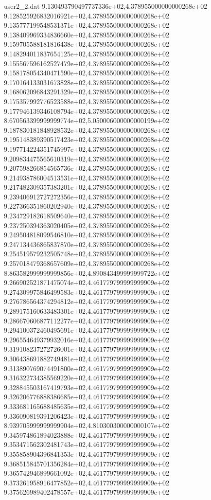 \begin{filecontents}{user2_2.dat}
9.130493790497737336e+02,4.378955000000000268e+02
9.128525926832016921e+02,4.378955000000000268e+02
9.135777199548531371e+02,4.378955000000000268e+02
9.138409969334836660e+02,4.378955000000000268e+02
9.159705588181816438e+02,4.378955000000000268e+02
9.148294011837654125e+02,4.378955000000000268e+02
9.155567596162527479e+02,4.378955000000000268e+02
9.158178054340471590e+02,4.378955000000000268e+02
9.170164133031673828e+02,4.378955000000000268e+02
9.168062096843291329e+02,4.378955000000000268e+02
9.175357992776523588e+02,4.378955000000000268e+02
9.177946139346108794e+02,4.378955000000000268e+02
8.670563399999999774e+02,5.050006000000000199e+02
9.187830181848928532e+02,4.378955000000000268e+02
9.195148389390517423e+02,4.378955000000000268e+02
9.197714224351745997e+02,4.378955000000000268e+02
9.209834475565610319e+02,4.378955000000000268e+02
9.207598266854565736e+02,4.378955000000000268e+02
9.214938786004513531e+02,4.378955000000000268e+02
9.217482309357383201e+02,4.378955000000000268e+02
9.239406912727272356e+02,4.378955000000000268e+02
9.227366351860202940e+02,4.378955000000000268e+02
9.234729182618509640e+02,4.378955000000000268e+02
9.237250394363020405e+02,4.378955000000000268e+02
9.249504818099546810e+02,4.378955000000000268e+02
9.247134436865837870e+02,4.378955000000000268e+02
9.254519579232505748e+02,4.378955000000000268e+02
9.257018479368657609e+02,4.378955000000000268e+02
8.863582999999999856e+02,4.890843499999999722e+02
9.266902521871475074e+02,4.461779799999999909e+02
9.274309975846499583e+02,4.461779799999999909e+02
9.276786564374294812e+02,4.461779799999999909e+02
9.289175160633483301e+02,4.461779799999999909e+02
9.286670606877112277e+02,4.461779799999999909e+02
9.294100372460495691e+02,4.461779799999999909e+02
9.296554649379932016e+02,4.461779799999999909e+02
9.319108237272726001e+02,4.461779799999999909e+02
9.306438691882749481e+02,4.461779799999999909e+02
9.313890769074491800e+02,4.461779799999999909e+02
9.316322734385569220e+02,4.461779799999999909e+02
9.328845503167419793e+02,4.461779799999999909e+02
9.326206776888386685e+02,4.461779799999999909e+02
9.333681165688485635e+02,4.461779799999999909e+02
9.336090819391206423e+02,4.461779799999999909e+02
8.939705999999999904e+02,4.810300300000000107e+02
9.345974861894023888e+02,4.461779799999999909e+02
9.353471562302481743e+02,4.461779799999999909e+02
9.355858904396841353e+02,4.461779799999999909e+02
9.368515845701356284e+02,4.461779799999999909e+02
9.365742946899661092e+02,4.461779799999999909e+02
9.373261958916477852e+02,4.461779799999999909e+02
9.375626989402478557e+02,4.461779799999999909e+02

\end{filecontents}
